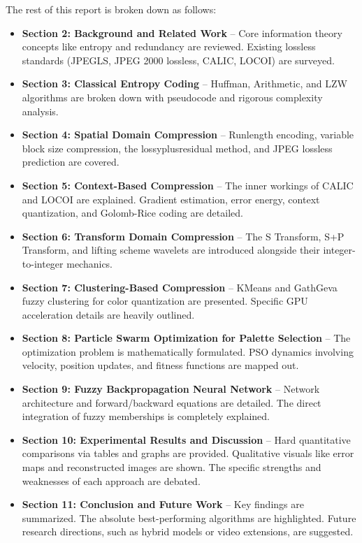 The rest of this report is broken down as follows:

\begin{itemize}
    \item \textbf{Section 2: Background and Related Work} – Core information theory concepts like entropy and redundancy are reviewed. Existing lossless standards (JPEGLS, JPEG 2000 lossless, CALIC, LOCOI) are surveyed.
    \item \textbf{Section 3: Classical Entropy Coding} – Huffman, Arithmetic, and LZW algorithms are broken down with pseudocode and rigorous complexity analysis.
    \item \textbf{Section 4: Spatial Domain Compression} – Runlength encoding, variable block size compression, the lossyplusresidual method, and JPEG lossless prediction are covered.
    \item \textbf{Section 5: Context-Based Compression} – The inner workings of CALIC and LOCOI are explained. Gradient estimation, error energy, context quantization, and Golomb-Rice coding are detailed.
    \item \textbf{Section 6: Transform Domain Compression} – The S Transform, S+P Transform, and lifting scheme wavelets are introduced alongside their integer-to-integer mechanics.
    \item \textbf{Section 7: Clustering-Based Compression} – KMeans and GathGeva fuzzy clustering for color quantization are presented. Specific GPU acceleration details are heavily outlined.
    \item \textbf{Section 8: Particle Swarm Optimization for Palette Selection} – The optimization problem is mathematically formulated. PSO dynamics involving velocity, position updates, and fitness functions are mapped out.
    \item \textbf{Section 9: Fuzzy Backpropagation Neural Network} – Network architecture and forward/backward equations are detailed. The direct integration of fuzzy memberships is completely explained.
    \item \textbf{Section 10: Experimental Results and Discussion} – Hard quantitative comparisons via tables and graphs are provided. Qualitative visuals like error maps and reconstructed images are shown. The specific strengths and weaknesses of each approach are debated.
    \item \textbf{Section 11: Conclusion and Future Work} – Key findings are summarized. The absolute best-performing algorithms are highlighted. Future research directions, such as hybrid models or video extensions, are suggested.
\end{itemize}